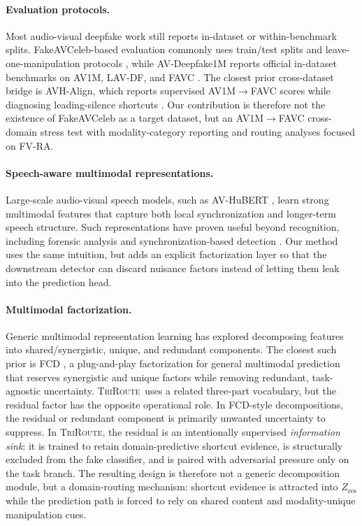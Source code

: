 \documentclass{article}
\newcommand{\method}{\textsc{TriRoute}}
\begin{document}
\paragraph{Evaluation protocols.}
Most audio-visual deepfake work still reports in-dataset or within-benchmark splits. FakeAVCeleb-based evaluation commonly uses train/test splits and leave-one-manipulation protocols \citep{feng2023avad, oorloff2024avff}, while AV-Deepfake1M reports official in-dataset benchmarks on AV1M, LAV-DF, and FAVC \citep{cai2024avdeepfake1m}. The closest prior cross-dataset bridge is AVH-Align, which reports supervised AV1M$\rightarrow$FAVC scores while diagnosing leading-silence shortcuts \citep{smeu2025avhalign}. Our contribution is therefore not the existence of FakeAVCeleb as a target dataset, but an AV1M$\rightarrow$FAVC cross-domain stress test with modality-category reporting and routing analyses focused on FV-RA.

\paragraph{Speech-aware multimodal representations.}
Large-scale audio-visual speech models, such as AV-HuBERT \citep{shi2022avhubert}, learn strong multimodal features that capture both local synchronization and longer-term speech structure. Such representations have proven useful beyond recognition, including forensic analysis and synchronization-based detection \citep{liang2024speechforensics, smeu2025avhalign}. Our method uses the same intuition, but adds an explicit factorization layer so that the downstream detector can discard nuisance factors instead of letting them leak into the prediction head.

\paragraph{Multimodal factorization.}
Generic multimodal representation learning has explored decomposing features into shared/synergistic, unique, and redundant components. The closest such prior is FCD \citep{liu2025fcd}, a plug-and-play factorization for general multimodal prediction that reserves synergistic and unique factors while removing redundant, task-agnostic uncertainty. \method\ uses a related three-part vocabulary, but the residual factor has the opposite operational role. In FCD-style decompositions, the residual or redundant component is primarily unwanted uncertainty to suppress. In \method, the residual is an intentionally supervised \emph{information sink}: it is trained to retain domain-predictive shortcut evidence, is structurally excluded from the fake classifier, and is paired with adversarial pressure only on the task branch. The resulting design is therefore not a generic decomposition module, but a domain-routing mechanism: shortcut evidence is attracted into $Z_{\mathrm{res}}$ while the prediction path is forced to rely on shared content and modality-unique manipulation cues.
\end{document}
